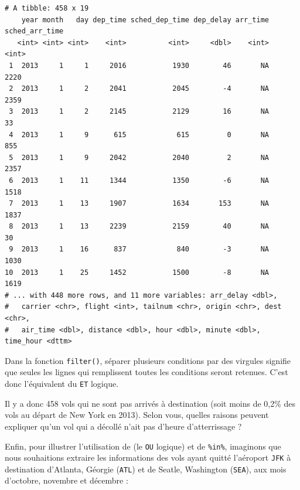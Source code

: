 \documentclass[a4paperpaper,]{article}
\newenvironment{Shaded}{\begin{snugshade}}{\end{snugshade}}
\newcommand{\DecValTok}[1]{\textcolor[rgb]{0.69,0.50,0.00}{#1}}
\newcommand{\KeywordTok}[1]{\textcolor[rgb]{0.12,0.11,0.11}{\textbf{#1}}}
\newcommand{\NormalTok}[1]{\textcolor[rgb]{0.12,0.11,0.11}{#1}}
\newcommand{\OperatorTok}[1]{\textcolor[rgb]{0.12,0.11,0.11}{#1}}
\newcommand{\StringTok}[1]{\textcolor[rgb]{0.75,0.01,0.01}{#1}}
\theoremstyle{definition}
\theoremstyle{definition}
\theoremstyle{definition}
\theoremstyle{remark}
\begin{document}
\begin{verbatim}
# A tibble: 458 x 19
    year month   day dep_time sched_dep_time dep_delay arr_time sched_arr_time
   <int> <int> <int>    <int>          <int>     <dbl>    <int>          <int>
 1  2013     1     1     2016           1930        46       NA           2220
 2  2013     1     2     2041           2045        -4       NA           2359
 3  2013     1     2     2145           2129        16       NA             33
 4  2013     1     9      615            615         0       NA            855
 5  2013     1     9     2042           2040         2       NA           2357
 6  2013     1    11     1344           1350        -6       NA           1518
 7  2013     1    13     1907           1634       153       NA           1837
 8  2013     1    13     2239           2159        40       NA             30
 9  2013     1    16      837            840        -3       NA           1030
10  2013     1    25     1452           1500        -8       NA           1619
# ... with 448 more rows, and 11 more variables: arr_delay <dbl>,
#   carrier <chr>, flight <int>, tailnum <chr>, origin <chr>, dest <chr>,
#   air_time <dbl>, distance <dbl>, hour <dbl>, minute <dbl>, time_hour <dttm>
\end{verbatim}

Dans la fonction \texttt{filter()}, séparer plusieurs conditions par des
virgules signifie que seules les lignes qui remplissent toutes les
conditions seront retenues. C'est donc l'équivalent du \texttt{ET}
logique.

Il y a donc 458 vols qui ne sont pas arrivés à destination (soit moins
de 0,2\% des vols au départ de New York en 2013). Selon vous, quelles
raisons peuvent expliquer qu'un vol qui a décollé n'ait pas d'heure
d'atterrissage ?

Enfin, pour illustrer l'utilisation de \texttt{\textbar{}} (le
\texttt{OU} logique) et de \texttt{\%in\%}, imaginons que nous
souhaitions extraire les informations des vols ayant quitté l'aéroport
\texttt{JFK} à destination d'Atlanta, Géorgie (\texttt{ATL}) et de
Seatle, Washington (\texttt{SEA}), aux mois d'octobre, novembre et
décembre :

\begin{Shaded}
\end{Shaded}
\end{document}
